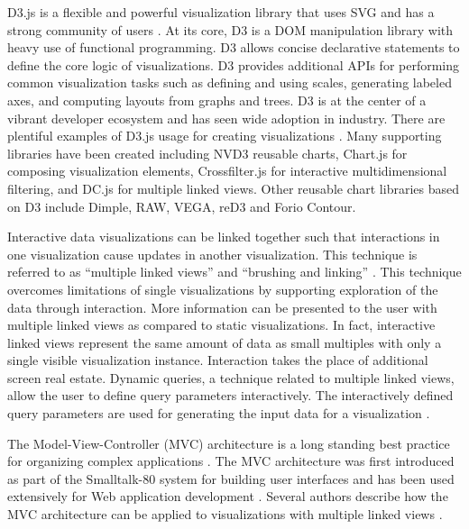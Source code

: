 D3.js is a flexible and powerful visualization library that uses SVG and has a strong community of users \cite{d3}. At its core, D3 is a DOM manipulation library with heavy use of functional programming. D3 allows concise declarative statements to define the core logic of visualizations. D3 provides additional APIs for performing common visualization tasks such as defining and using scales, generating labeled axes, and computing layouts from graphs and trees. D3 is at the center of a vibrant developer ecosystem and has seen wide adoption in industry. There are plentiful examples of D3.js usage for creating visualizations \cite{d3examples}. Many supporting libraries have been created including NVD3 reusable charts, Chart.js for composing visualization elements, Crossfilter.js for interactive multidimensional filtering, and DC.js for multiple linked views. Other reusable chart libraries based on D3 include Dimple, RAW, VEGA, reD3 and Forio Contour.

Interactive data visualizations can be linked together such that interactions in one visualization cause updates in another visualization. This technique is referred to as ``multiple linked views'' \cite{roberts2004exploratory} and ``brushing and linking'' \cite{keim2002information, anselin2002visualizing}. This technique overcomes limitations of single visualizations by supporting exploration of the data through interaction. More information can be presented to the user with multiple linked views as compared to static visualizations. In fact, interactive linked views represent the same amount of data as small multiples with only a single visible visualization instance. Interaction takes the place of additional screen real estate. Dynamic queries, a technique related to multiple linked views, allow the user to define query parameters interactively. The interactively defined query parameters are used for generating the input data for a visualization \cite{shneiderman1994dynamic}.

The Model-View-Controller (MVC) architecture is a long standing best practice for organizing complex applications \cite{deacon2009model}. The MVC architecture was first introduced as part of the Smalltalk-80 system for building user interfaces \cite{krasner1988description} and has been used extensively for Web application development \cite{leff2001web}. Several authors describe how the MVC architecture can be applied to visualizations with multiple linked views \cite{heer2006software, hatanaka1999providing, weaver2004building, boukhelifa2003coordination}.


